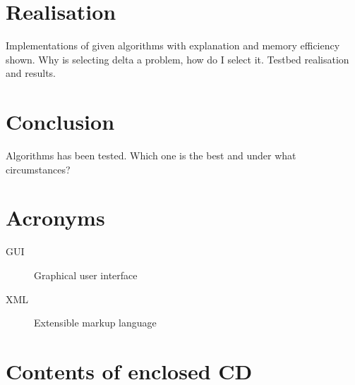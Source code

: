 \documentclass[thesis=B,english]{FITthesis}[2012/10/20]
\begin{document}
\chapter{Realisation}
Implementations of given algorithms with explanation and memory efficiency shown.
Why is selecting delta a problem, how do I select it.
Testbed realisation and results.

\chapter{Conclusion}
Algorithms has been tested.
Which one is the best and under what circumstances?




\appendix

\chapter{Acronyms}
\begin{description}
	\item[GUI] Graphical user interface
	\item[XML] Extensible markup language
\end{description}


\chapter{Contents of enclosed CD}


\begin{figure}
\end{figure}
\end{document}
